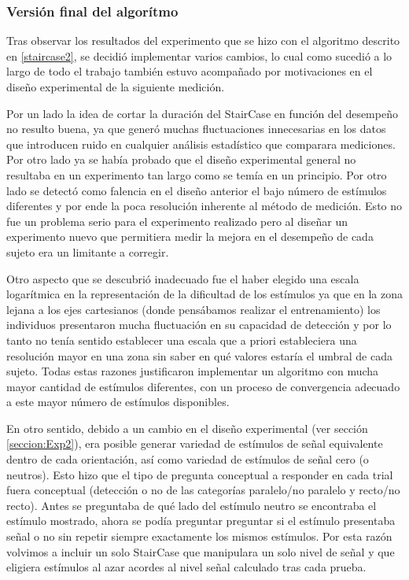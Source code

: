 \documentclass{article}
\numberwithin{figure}{section}
\begin{document}
    \subsubsection{Versión final del algorítmo} \label{staircase3}
    
    Tras observar los resultados del experimento que se hizo con el algoritmo descrito en \ref{staircase2}, se decidió implementar varios cambios, lo cual como sucedió a lo largo de todo el trabajo también estuvo acompañado por motivaciones en el diseño experimental de la siguiente medición.
    
    Por un lado la idea de cortar la duración del StairCase en función del desempeño no resulto buena, ya que generó muchas fluctuaciones innecesarias en los datos que introducen ruido en cualquier análisis estadístico que comparara mediciones. Por otro lado ya se había probado que el diseño experimental general no resultaba en un experimento tan largo como se temía en un principio. Por otro lado se detectó como falencia en el diseño anterior el bajo número de estímulos diferentes y por ende la poca resolución inherente al método de medición. Esto no fue un problema serio para el experimento realizado pero al diseñar un experimento nuevo que permitiera medir la mejora en el desempeño de cada sujeto era un limitante a corregir. 
    
    Otro aspecto que se descubrió inadecuado fue el haber elegido una escala logarítmica en la representación de la dificultad de los estímulos ya que en la zona lejana a los ejes cartesianos (donde pensábamos realizar el entrenamiento) los individuos presentaron mucha fluctuación en su capacidad de detección y por lo tanto no tenía sentido establecer una escala que a priori estableciera una resolución mayor en una zona sin saber en qué valores estaría el umbral de cada sujeto. Todas estas razones justificaron implementar un algoritmo con mucha mayor cantidad de estímulos diferentes, con un proceso de convergencia adecuado a este mayor número de estímulos disponibles. 
    
    En otro sentido, debido a un cambio en el diseño experimental (ver sección \ref{seccion:Exp2}), era posible generar variedad de estímulos de señal equivalente dentro de cada orientación, así como variedad de estímulos de señal cero (o neutros). Esto hizo que el tipo de pregunta conceptual a responder en cada trial fuera conceptual (detección o no de las categorías paralelo/no paralelo y recto/no recto). Antes se preguntaba de qué lado del estímulo neutro se encontraba el estímulo mostrado, ahora se podía preguntar preguntar si el estímulo presentaba señal o no sin repetir siempre exactamente los mismos estímulos. Por esta razón volvimos a incluir un solo StairCase que manipulara un solo nivel de señal y que eligiera estímulos al azar acordes al nivel señal calculado tras cada prueba. 
    
\end{document}
